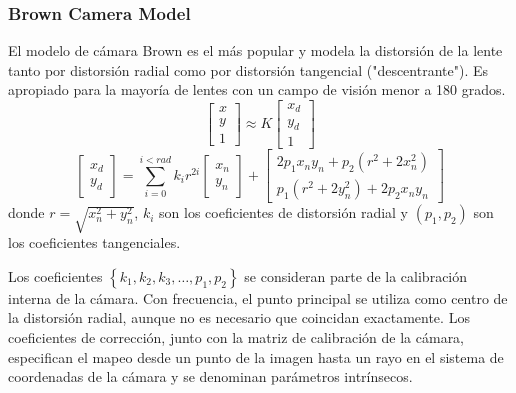 \begin{frame}
    \frametitle{Brown Camera Model}

    El modelo de cámara Brown es el más popular y modela la distorsión de la lente tanto por distorsión radial como por distorsión tangencial ("descentrante"). Es apropiado para la mayoría de lentes con un campo de visión menor a 180 grados.
    \begin{equation*}
        \begin{bmatrix}
            x \\
            y \\
            1
        \end{bmatrix} \approx K \begin{bmatrix}
            x_d \\
            y_d \\
            1
        \end{bmatrix}
    \end{equation*}
    \begin{equation*}
        \begin{bmatrix}
            x_d \\
            y_d
        \end{bmatrix} =
        \sum_{i=0}^{i<rad} k_{i} r^{2i}
        \begin{bmatrix}
            x_n \\
            y_n
        \end{bmatrix} +
        \begin{bmatrix}
            2p_{1} x_n y_n + p_{2} (r^2 + 2x_n^2) \\
            p_{1} (r^2 + 2y_n^2) + 2p_{2} x_n y_n
        \end{bmatrix}
    \end{equation*}
    donde $r = \sqrt{x_n^2 + y_n^2}$, $k_{i}$ son los coeficientes de distorsión radial y $(p_{1}, p_{2})$ son los coeficientes tangenciales.

    Los coeficientes $\left\{ k_{1}, k_{2}, k_{3}, \ldots , p_{1}, p_{2} \right\}$ se consideran parte de la calibración interna de la cámara. Con frecuencia, el punto principal se utiliza como centro de la distorsión radial, aunque no es necesario que coincidan exactamente. Los coeficientes de corrección, junto con la matriz de calibración de la cámara, especifican el mapeo desde un punto de la imagen hasta un rayo en el sistema de coordenadas de la cámara y se denominan parámetros intrínsecos.

\end{frame}

